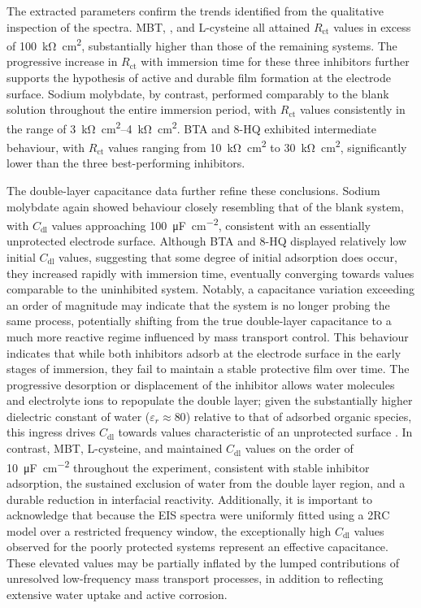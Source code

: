\documentclass[11pt,twoside,a4paper,final]{report}
\begin{document}
The extracted parameters confirm the trends identified from the qualitative inspection of the spectra. MBT, , and L-cysteine all attained $R_{\text{ct}}$ values in excess of \qty{100}{\kilo\ohm\centi\meter\squared}, substantially higher than those of the remaining systems. The progressive increase in $R_{\text{ct}}$ with immersion time for these three inhibitors further supports the hypothesis of active and durable film formation at the electrode surface. Sodium molybdate, by contrast, performed comparably to the blank  solution throughout the entire immersion period, with $R_{\text{ct}}$ values consistently in the range of \qtyrange{3}{4}{\kilo\ohm\centi\meter\squared}. BTA and 8-HQ exhibited intermediate behaviour, with $R_{\text{ct}}$ values ranging from \qty{10}{\kilo\ohm\centi\meter\squared} to \qty{30}{\kilo\ohm\centi\meter\squared}, significantly lower than the three best-performing inhibitors.

The double-layer capacitance data further refine these conclusions. Sodium molybdate again showed behaviour closely resembling that of the blank  system, with $C_{\text{dl}}$ values approaching \qty{100}{\micro\farad\per\centi\meter\squared}, consistent with an essentially unprotected electrode surface. Although BTA and 8-HQ displayed relatively low initial $C_{\text{dl}}$ values, suggesting that some degree of initial adsorption does occur, they increased rapidly with immersion time, eventually converging towards values comparable to the uninhibited system. Notably, a capacitance variation exceeding an order of magnitude may indicate that the system is no longer probing the same process, potentially shifting from the true double-layer capacitance to a much more reactive regime influenced by mass transport control. This behaviour indicates that while both inhibitors adsorb at the electrode surface in the early stages of immersion, they fail to maintain a stable protective film over time. The progressive desorption or displacement of the inhibitor allows water molecules and electrolyte ions to repopulate the double layer; given the substantially higher dielectric constant of water ($\varepsilon_r \approx 80$) relative to that of adsorbed organic species, this ingress drives $C_{\text{dl}}$ towards values characteristic of an unprotected surface \cite{Orazem2008, Sastri2007}. In contrast, MBT, L-cysteine, and  maintained $C_{\text{dl}}$ values on the order of \qty{10}{\micro\farad\per\centi\meter\squared} throughout the experiment, consistent with stable inhibitor adsorption, the sustained exclusion of water from the double layer region, and a durable reduction in interfacial reactivity. Additionally, it is important to acknowledge that because the EIS spectra were uniformly fitted using a 2RC model over a restricted frequency window, the exceptionally high $C_{\text{dl}}$ values observed for the poorly protected systems represent an effective capacitance. These elevated values may be partially inflated by the lumped contributions of unresolved low-frequency mass transport processes, in addition to reflecting extensive water uptake and active corrosion.
\end{document}
